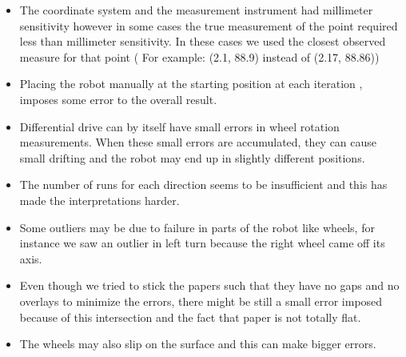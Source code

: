 \documentclass{scrartcl}
\begin{document}
\begin{itemize}
\item The coordinate system and the measurement instrument had millimeter sensitivity however in some cases the true measurement of the point required less than millimeter sensitivity. In these cases we used the closest observed measure for that point ( For example: (2.1, 88.9) instead of (2.17, 88.86)) 
\item Placing the robot manually at the starting position at each iteration , imposes some error to the overall result.
\item Differential drive can by itself have small errors in wheel rotation measurements. When these small errors are accumulated, they can cause small drifting and the robot may end up in slightly different positions. 
\item The number of runs for each direction seems to be insufficient and this has made the interpretations harder. 
\item Some outliers may be due to failure in parts of the robot like wheels, for instance we saw an outlier in left turn because the right wheel came off its axis.  
\item Even though we tried to stick the papers such that they have no gaps and no overlays to minimize the errors, there might be still a small error imposed because of this intersection and the fact that paper is not totally flat.
\item The wheels may also slip on the surface and this can make bigger errors.
\end{itemize}









%



%
\end{document}
